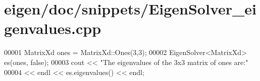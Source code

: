 \hypertarget{eigen_2doc_2snippets_2_eigen_solver__eigenvalues_8cpp_source}{}\section{eigen/doc/snippets/\+Eigen\+Solver\+\_\+eigenvalues.cpp}
\label{eigen_2doc_2snippets_2_eigen_solver__eigenvalues_8cpp_source}

\begin{DoxyCode}
00001 MatrixXd ones = MatrixXd::Ones(3,3);
00002 EigenSolver<MatrixXd> es(ones, \textcolor{keyword}{false});
00003 cout << \textcolor{stringliteral}{"The eigenvalues of the 3x3 matrix of ones are:"} 
00004      << endl << es.eigenvalues() << endl;
\end{DoxyCode}
